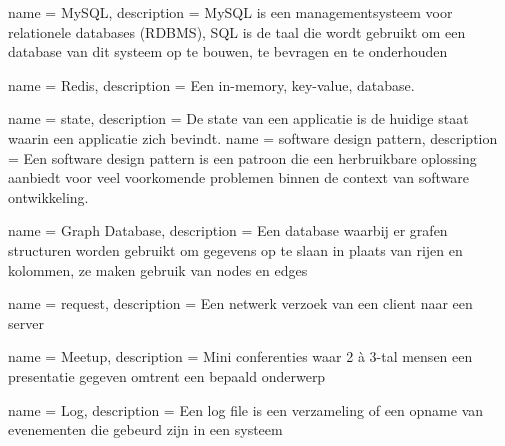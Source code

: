 


{
  name = MySQL,
  description = {MySQL is een managementsysteem voor relationele databases (\gls{RDBMS}), SQL is de taal die wordt gebruikt om een database van dit systeem op te bouwen, te bevragen en te onderhouden}
}

{
  name = Redis,
  description = {Een in-memory, key-value, database.}
}

{
  name = state,
  description = {De state van een applicatie is de huidige staat waarin een applicatie zich bevindt.}
}
{
  name = {software design pattern},
  description = {Een software design pattern is een patroon die een herbruikbare oplossing aanbiedt voor veel voorkomende problemen binnen de context van software ontwikkeling.}
}

{
  name = {Graph Database},
  description = {Een database waarbij er grafen structuren worden gebruikt om gegevens op te slaan in plaats van rijen en kolommen, ze maken gebruik van nodes en edges}
}

{
  name = request,
  description = {Een netwerk verzoek van een client naar een server}
}

{
  name = Meetup,
  description = {Mini conferenties waar 2 à 3-tal mensen een presentatie gegeven omtrent een bepaald onderwerp}
}

{
  name = Log,
  description = {Een log file is een verzameling of een opname van evenementen die gebeurd zijn in een systeem}
}

